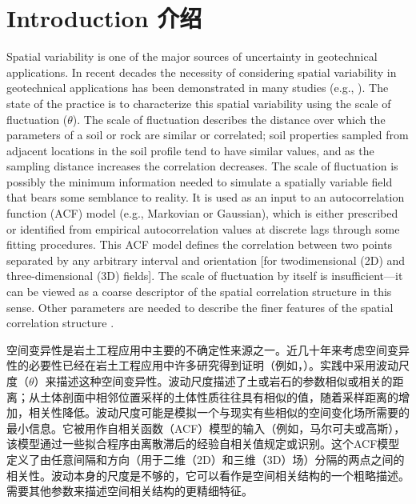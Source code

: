 \section*{Introduction 介绍}

\begin{ParaColumn}
    Spatial variability is one of the major sources of uncertainty in geotechnical applications. In recent decades the necessity of considering spatial variability in geotechnical applications has been demonstrated in many studies (e.g., \citet{Griffiths1993577,Griffiths20091367,Cho2010975,Soubra2010275,Hicks2010948,Huang2010343,Stuedlein20121314,Cassidy2013191,Jha2013708,Javankhoshdel20141033,Jiang2014120,Le2014250,Li201560,Javankhoshdel2016,Xiao2016146,Li2016146,Luo201645,Javankhoshdel2017231,Papaioannou2017116}). The state of the practice is to characterize this spatial variability using the scale of fluctuation ($\theta$). The scale of fluctuation describes the distance over which the parameters of a soil or rock are similar or correlated; soil properties sampled from adjacent locations in the soil profile tend to have similar values, and as the sampling distance increases the correlation decreases. The scale of fluctuation is possibly the minimum information needed to simulate a spatially variable field that bears some semblance to reality. It is used as an input to an autocorrelation function (ACF) model (e.g., Markovian or Gaussian), which is either prescribed or identified from empirical autocorrelation values at discrete lags through some fitting procedures. This ACF model defines the correlation between two points separated by any arbitrary interval and orientation [for twodimensional (2D) and three-dimensional (3D) fields]. The scale of fluctuation by itself is insufficient—it can be viewed as a coarse descriptor of the spatial correlation structure in this sense. Other parameters are needed to describe the finer features of the spatial correlation structure \citep{Ching2019145}.

    \switchcolumn

    空间变异性是岩土工程应用中主要的不确定性来源之一。近几十年来考虑空间变异性的必要性已经在岩土工程应用中许多研究得到证明（例如，\citet{Griffiths1993577,Griffiths20091367,Cho2010975,Soubra2010275,Hicks2010948,Huang2010343,Stuedlein20121314,Cassidy2013191,Jha2013708,Javankhoshdel20141033,Jiang2014120,Le2014250,Li201560,Javankhoshdel2016,Xiao2016146,Li2016146,Luo201645,Javankhoshdel2017231,Papaioannou2017116}）。实践中采用波动尺度（$\theta$）来描述这种空间变异性。波动尺度描述了土或岩石的参数相似或相关的距离；从土体剖面中相邻位置采样的土体性质往往具有相似的值，随着采样距离的增加，相关性降低。波动尺度可能是模拟一个与现实有些相似的空间变化场所需要的最小信息。它被用作自相关函数（ACF）模型的输入（例如，马尔可夫或高斯），该模型通过一些拟合程序由离散滞后的经验自相关值规定或识别。这个ACF模型定义了由任意间隔和方向（用于二维（2D）和三维（3D）场）分隔的两点之间的相关性。波动本身的尺度是不够的，它可以看作是空间相关结构的一个粗略描述。需要其他参数来描述空间相关结构的更精细特征\citep{Ching2019145}。


\end{ParaColumn}

